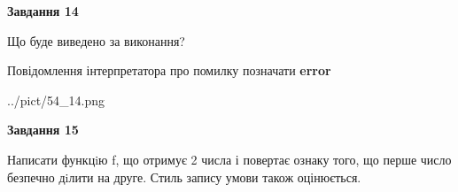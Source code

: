 \documentclass[11pt, ukrainian]{article}
\begin{document}
{\begin {large}
{\begin {center}\textbf{Завдання 14}\end {center}}\par
Що буде виведено за виконання? \par
Повідомлення інтерпретатора про помилку позначати \textbf{error}

\begin{center}
	{../pict/54_14.png}
\end{center}
\newpage

{\begin {center}\textbf{Завдання 15}\end {center}}\par

Написати функцiю f, що отримує 2 числа і повертає ознаку того, що перше число безпечно дiлити на друге. Стиль запису умови також оцінюється.\par
\newpage

\end {large}}
\end{document}
